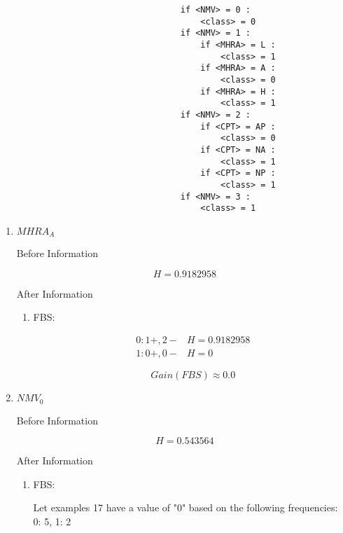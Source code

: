 \begin{enumerate}
\begin{enumerate}
\begin{enumerate}
\begin{enumerate}
								\begin{lstlisting}
									if <NMV> = 0 :
										<class> = 0
									if <NMV> = 1 :
										if <MHRA> = L :
											<class> = 1
										if <MHRA> = A :
											<class> = 0
										if <MHRA> = H :
											<class> = 1
									if <NMV> = 2 :
										if <CPT> = AP :
											<class> = 0
										if <CPT> = NA :
											<class> = 1
										if <CPT> = NP :
											<class> = 1
									if <NMV> = 3 :
										<class> = 1
								\end{lstlisting}
												
						\end{enumerate}
				
				\end{enumerate}
				
				
				\begin{enumerate}
				
					\item{\(MHRA_A\)}
					
						Before Information
						
							\[
								H = 0.9182958
							\]
							
						After Information
						
						\begin{enumerate}
						
							\item{FBS:}
															
								\[
									\begin{array}{l|l}
										0: 1+, 2- & H = 0.9182958 \\
										1: 0+, 0- & H = 0
									\end{array}
								\]
								
								\[
									Gain(FBS) \approx 0.0
								\]
								
						\end{enumerate}
					
						
					\item{\(NMV_0\)}
					
						Before Information
						
							\[
								H = 0.543564
							\]
						
						After Information
							
						\begin{enumerate}
						
							\item{FBS:}
							
								Let examples 17 have a value of "0" based on the following frequencies: \\
								0: 5, 1: 2
								

\end{enumerate}
\end{enumerate}
\end{enumerate}
\end{enumerate}

